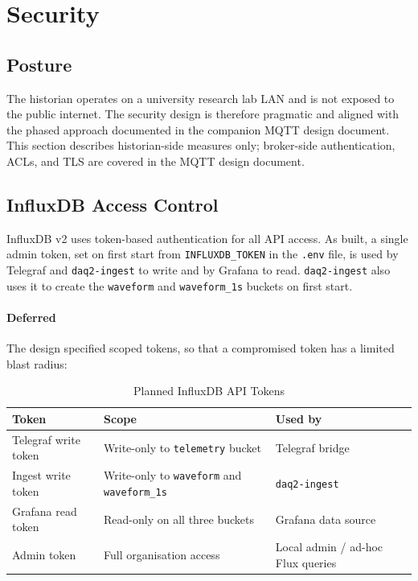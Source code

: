 \section{Security}
\label{sec:security}

\subsection{Posture}
The historian operates on a university research lab LAN and is not exposed to the public internet. The security design is therefore pragmatic and aligned with the phased approach documented in the companion MQTT design document. This section describes historian-side measures only; broker-side authentication, ACLs, and TLS are covered in the MQTT design document.

\subsection{InfluxDB Access Control}
InfluxDB v2 uses token-based authentication for all API access. As built, a single admin token, set on first start from \texttt{INFLUXDB\_TOKEN} in the \texttt{.env} file, is used by Telegraf and \texttt{daq2-ingest} to write and by Grafana to read. \texttt{daq2-ingest} also uses it to create the \texttt{waveform} and \texttt{waveform\_1s} buckets on first start.

\paragraph{Deferred} The design specified scoped tokens, so that a compromised token has a limited blast radius:
\begin{table}[H]
\centering
\caption{Planned InfluxDB API Tokens}
\begin{tabular}{lll}
\hline
\textbf{Token} & \textbf{Scope} & \textbf{Used by} \\
\hline
Telegraf write token & Write-only to \texttt{telemetry} bucket & Telegraf bridge \\
Ingest write token   & Write-only to \texttt{waveform} and \texttt{waveform\_1s} & \texttt{daq2-ingest} \\
Grafana read token   & Read-only on all three buckets  & Grafana data source \\
Admin token          & Full organisation access               & Local admin / ad-hoc Flux queries \\
\hline
\end{tabular}
\end{table}

